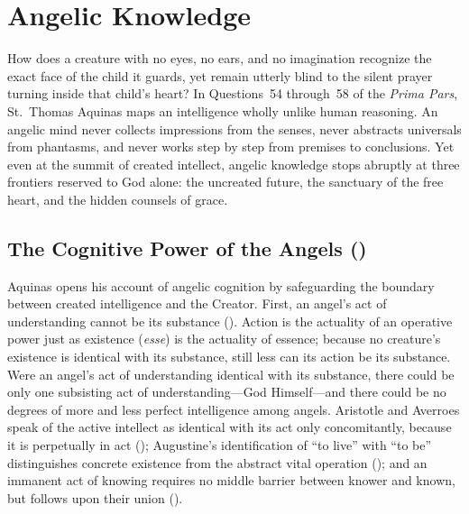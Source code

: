 \section{Angelic Knowledge}\label{sec:st-knowledge}

How does a creature with no eyes, no ears, and no imagination recognize the exact face of the child it guards, yet remain utterly blind to the silent prayer turning inside that child's heart? In Questions~54 through~58 of the \emph{Prima Pars}, St.~Thomas Aquinas maps an intelligence wholly unlike human reasoning. An angelic mind never collects impressions from the senses, never abstracts universals from phantasms, and never works step by step from premises to conclusions. Yet even at the summit of created intellect, angelic knowledge stops abruptly at three frontiers reserved to God alone: the uncreated future, the sanctuary of the free heart, and the hidden counsels of grace.

\subsection{The Cognitive Power of the Angels ()}

Aquinas opens his account of angelic cognition by safeguarding the boundary between created intelligence and the Creator. First, an angel's act of understanding cannot be its substance (). Action is the actuality of an operative power just as existence (\emph{esse}) is the actuality of essence; because no creature's existence is identical with its substance, still less can its action be its substance. Were an angel's act of understanding identical with its substance, there could be only one subsisting act of understanding---God Himself---and there could be no degrees of more and less perfect intelligence among angels. Aristotle and Averroes speak of the active intellect as identical with its act only concomitantly, because it is perpetually in act (); Augustine's identification of ``to live'' with ``to be'' distinguishes concrete existence from the abstract vital operation (); and an immanent act of knowing requires no middle barrier between knower and known, but follows upon their union ().

